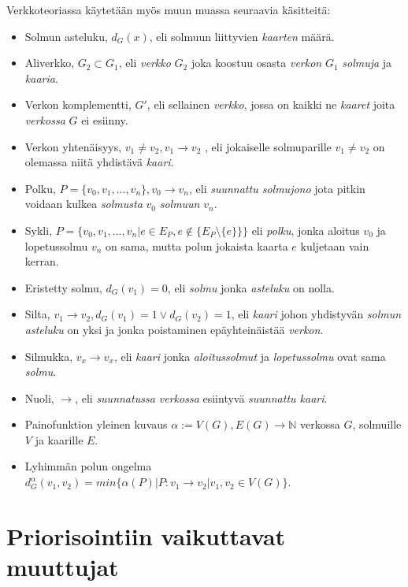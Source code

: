   Verkkoteoriassa käytetään myös muun muassa seuraavia käsitteitä:
  \begin{itemize}
    \item Solmun asteluku, \(d_G(x)\), eli solmuun liittyvien \emph{kaarten} määrä.
    \item Aliverkko, \(G_2 \subset G_1\), eli \emph{verkko} \(G_2\) joka koostuu osasta \emph{verkon} \(G_1\) \emph{solmuja} ja \emph{kaaria}.
    \item Verkon komplementti, \(G'\), eli sellainen \emph{verkko}, jossa on kaikki ne \emph{kaaret} joita \emph{verkossa} \(G\) ei esiinny.
    \item Verkon yhtenäisyys, \(v_1 \neq v_2, v_1 \rightarrow v_2\) , eli jokaiselle solmuparille \(v_1 \neq v_2\) on olemassa niitä yhdistävä \emph{kaari}.
    \item Polku, \(P = \{v_0, v_1, ..., v_n\}, v_0 \rightarrow v_n\), eli \emph{suunnattu solmujono} jota pitkin voidaan kulkea \emph{solmusta} \(v_0\) \emph{solmuun} \(v_n\).
    \item Sykli, \(P = \{v_0, v_1, ..., v_n| e \in E_P, e \notin \{E_P \setminus \{e\} \}\}\) eli \emph{polku}, jonka aloitus \(v_0\) ja lopetussolmu \(v_n\) on sama, mutta polun jokaista kaarta \(e\) kuljetaan vain kerran.
    \item Eristetty solmu, \(d_G(v_1) = 0\), eli \emph{solmu} jonka \emph{asteluku} on nolla.
    \item Silta, \(v_1 \rightarrow v_2, d_G(v_1) = 1 \lor d_G(v_2) = 1\), eli \emph{kaari} johon yhdistyvän \emph{solmun asteluku} on yksi ja jonka poistaminen epäyhteinäistää \emph{verkon}.
    \item Silmukka, \(v_x \rightarrow v_x\), eli \emph{kaari} jonka \emph{aloitussolmut} ja \emph{lopetussolmu} ovat sama \emph{solmu}.
    \item Nuoli, \(\rightarrow\), eli \emph{suunnatussa verkossa} esiintyvä \emph{suunnattu kaari}.
    \item Painofunktion yleinen kuvaus \(\alpha := V(G), E(G) \rightarrow \mathbb{N}\) verkossa \(G\), solmuille \(V\) ja kaarille \(E\).
    \item Lyhimmän polun ongelma \(d_G^\alpha(v_1, v_2) = min\{\alpha(P) | P:v_1 \rightarrow v_2 | v_1, v_2 \in V(G)\}\).
  \end{itemize}

\section{Priorisointiin vaikuttavat muuttujat} \label{ch:10_priorisointiin_vaikuttavat_muuttujat}

